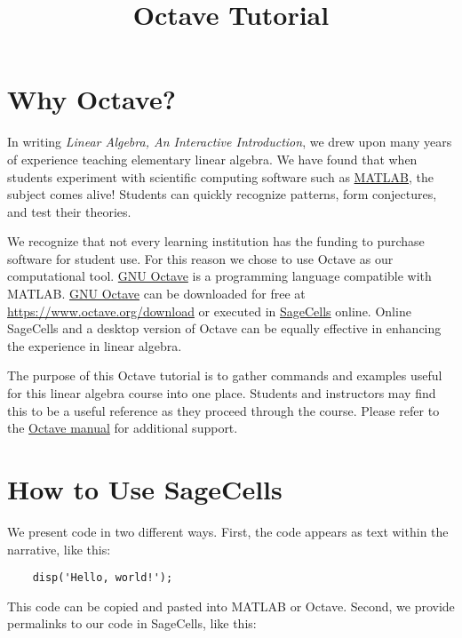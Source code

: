 \documentclass{ximera}
\title{Octave Tutorial} \license{CC BY-NC-SA 4.0}
\begin{document}
\begin{abstract}
\end{abstract}
\maketitle
\section*{Why Octave?}

In writing \textit{Linear Algebra, An Interactive Introduction}, we drew upon many years of experience teaching elementary linear algebra.  We have found that when students experiment with scientific computing software such as \href{https://www.mathworks.com/products/matlab.html}{MATLAB}, the subject comes alive!  Students can quickly recognize patterns, form conjectures, and test their theories.  

We recognize that not every learning institution has the funding to purchase software for student use.  For this reason we chose to use Octave as our computational tool.  \href{https://en.wikipedia.org/wiki/GNU_Octave}{GNU Octave} is a programming language compatible with MATLAB.  \href{https://www.octave.org/}{GNU Octave} can be downloaded for free at \href{https://www.octave.org/download}{https://www.octave.org/download} or executed in \href{https://sagecell.sagemath.org/}{SageCells} online.  Online SageCells and a desktop version of Octave can be equally effective in enhancing the experience in linear algebra.

The purpose of this Octave tutorial is to gather commands and examples useful for this linear algebra course into one place.  Students and instructors may find this to be a useful reference as they proceed through the course. Please refer to the \href{https://octave.org/support}{Octave manual} for additional support.

\section*{How to Use SageCells}
We present code in two different ways.  First, the code appears as text within the narrative, like this:

\begin{verbatim}
    disp('Hello, world!');
\end{verbatim}

This code can be copied and pasted into MATLAB or Octave.  Second, we provide permalinks to our code in SageCells, like this:
\end{document}
